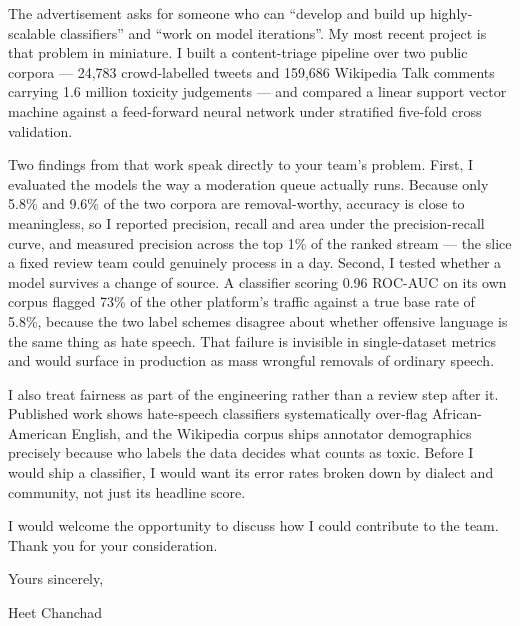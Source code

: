 \noindent The advertisement asks for someone who can ``develop and build up
highly-scalable classifiers'' and ``work on model iterations''. My most recent project is
that problem in miniature. I built a content-triage pipeline over two public corpora ---
24,783 crowd-labelled tweets and 159,686 Wikipedia Talk comments carrying 1.6 million
toxicity judgements --- and compared a linear support vector machine against a
feed-forward neural network under stratified five-fold cross validation.

\vspace{8pt}

\noindent Two findings from that work speak directly to your team's problem. First, I
evaluated the models the way a moderation queue actually runs. Because only 5.8\% and
9.6\% of the two corpora are removal-worthy, accuracy is close to meaningless, so I
reported precision, recall and area under the precision-recall curve, and measured
precision across the top 1\% of the ranked stream --- the slice a fixed review team could
genuinely process in a day. Second, I tested whether a model survives a change of source.
A classifier scoring 0.96 ROC-AUC on its own corpus flagged 73\% of the other platform's
traffic against a true base rate of 5.8\%, because the two label schemes disagree about
whether offensive language is the same thing as hate speech. That failure is invisible in
single-dataset metrics and would surface in production as mass wrongful removals of
ordinary speech.

\vspace{8pt}

\noindent I also treat fairness as part of the engineering rather than a review step after
it. Published work shows hate-speech classifiers systematically over-flag African-American
English, and the Wikipedia corpus ships annotator demographics precisely because who
labels the data decides what counts as toxic. Before I would ship a classifier, I would
want its error rates broken down by dialect and community, not just its headline score.

\vspace{8pt}

\noindent I would welcome the opportunity to discuss how I could contribute to the team.
Thank you for your consideration.

\vspace{12pt}

\noindent Yours sincerely,

\vspace{16pt}

\noindent Heet Chanchad

\endgroup
